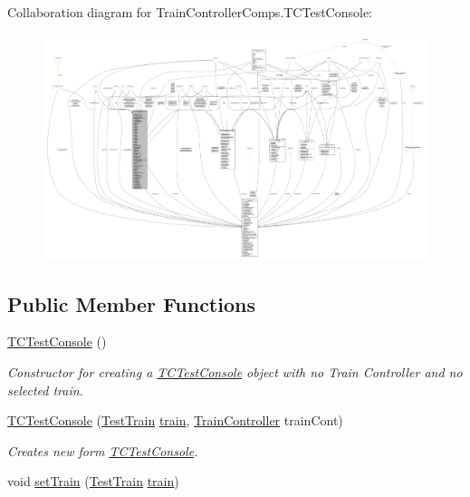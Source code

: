 Collaboration diagram for Train\+Controller\+Comps.\+T\+C\+Test\+Console\+:
\nopagebreak
\begin{figure}[H]
\begin{center}
\leavevmode
\includegraphics[width=350pt]{classTrainControllerComps_1_1TCTestConsole__coll__graph}
\end{center}
\end{figure}
\subsection*{Public Member Functions}
\begin{DoxyCompactItemize}
\item 
\hyperlink{classTrainControllerComps_1_1TCTestConsole_a760b79fd912301b36a19c372eafc1616}{T\+C\+Test\+Console} ()
\begin{DoxyCompactList}\small\item\em Constructor for creating a \hyperlink{classTrainControllerComps_1_1TCTestConsole}{T\+C\+Test\+Console} object with no Train Controller and no selected train. \end{DoxyCompactList}\item 
\hyperlink{classTrainControllerComps_1_1TCTestConsole_acb9494e195e57188bc7150aa96faef80}{T\+C\+Test\+Console} (\hyperlink{classTrainControllerComps_1_1TestTrain}{Test\+Train} \hyperlink{classtrain}{train}, \hyperlink{classTrainControllerComps_1_1TrainController}{Train\+Controller} train\+Cont)
\begin{DoxyCompactList}\small\item\em Creates new form \hyperlink{classTrainControllerComps_1_1TCTestConsole}{T\+C\+Test\+Console}. \end{DoxyCompactList}\item 
void \hyperlink{classTrainControllerComps_1_1TCTestConsole_a3519b295cbb041ec2af003311057f589}{set\+Train} (\hyperlink{classTrainControllerComps_1_1TestTrain}{Test\+Train} \hyperlink{classtrain}{train})
\end{DoxyCompactItemize}
